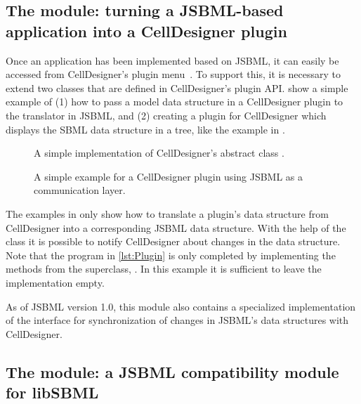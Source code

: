 \subsection{The  module: turning a JSBML-based
  application into a CellDesigner plugin}

Once an application has been implemented based on JSBML, it can easily be
accessed from CellDesigner's plugin menu~\citep{Funahashi2003}. To support
this, it is necessary to extend two classes that are defined in
CellDesigner's plugin API.  
show a simple example of (1) how to pass a model
data structure in a CellDesigner plugin to the translator in JSBML, and (2)
creating a plugin for CellDesigner which displays the SBML data structure
in a tree, like the example in .

\begin{figure}[thb]
  \caption{A simple implementation of CellDesigner's abstract class
    .}
  \label{lst:PluginAction}
\end{figure}

\begin{figure}[thb]
  \caption{A simple example for a CellDesigner plugin using JSBML as a
    communication layer.}
  \label{lst:Plugin}
\end{figure}

The examples in  only show
how to translate a plugin's data structure from CellDesigner into a
corresponding JSBML data structure. With the help of the class
\PluginSBMLWriter it is possible to notify CellDesigner about changes in
the data structure. Note that the program in \vref{lst:Plugin} is
only completed by implementing the methods from the superclass,
. In this example it is sufficient to leave the
implementation empty.

As of JSBML version 1.0, this module also contains a specialized
implementation of the \TreeNodeChangeListener{} interface for
synchronization of changes in JSBML's data structures with CellDesigner.

\subsection{The  module: a JSBML compatibility
  module for libSBML}

